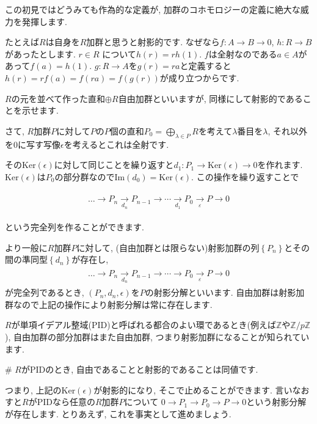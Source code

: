 \documentclass{jsarticle}
\def\Im{\mathrm{Im}}
\def\Ker{\mathrm{Ker}}
\theoremstyle{definition}
\numberwithin{theorem}{section}
\begin{document}
この初見ではどうみても作為的な定義が, 加群のコホモロジーの定義に絶大な威力を発揮します.

たとえば$R$は自身を$R$加群と思うと射影的です. なぜなら$f: A\rightarrow B\rightarrow 0$, $h: R \rightarrow B$があったとします.
$r\in R$ について$h(r) = rh(1)$. $f$は全射なのである$a\in A$があって$f(a) = h(1)$. $g:R \rightarrow A$を$g(r) = ra$と定義すると
$h(r) = rf(a) = f(ra) = f(g(r))$が成り立つからです.

$R$の元を並べて作った直和$\oplus R$自由加群といいますが, 同様にして射影的であることを示せます.

さて, $R$加群$P$に対して$P$の$P$個の直和$\displaystyle P_0 = \bigoplus_{\lambda\in P} R$を考えて$\lambda$番目を$\lambda$, それ以外を0に写す写像$\epsilon$を考えるとこれは全射です.

その$\Ker(\epsilon)$に対して同じことを繰り返すと$d_1: P_1 \rightarrow \Ker(\epsilon) \rightarrow 0$を作れます.
$\Ker(\epsilon)$は$P_0$の部分群なので$\Im(d_0) = \Ker(\epsilon)$. この操作を繰り返すことで


\begin{eqnarray*}
\begin{aligned}
\ldots \rightarrow P_n \xrightarrow[d_n]{} P_{n-1} \rightarrow \cdots \xrightarrow[d_1]{} P_0 \xrightarrow[\varepsilon]{} P \rightarrow 0
\end{aligned}
\end{eqnarray*}

という完全列を作ることができます.

より一般に$R$加群$P$に対して, (自由加群とは限らない)射影加群の列$\left\{P_n\right\}$とその間の準同型$\left\{d_n\right\}$が存在し, 
\begin{eqnarray*}
\begin{aligned}
\ldots \rightarrow P_n \xrightarrow[d_n]{} P_{n-1} \rightarrow \cdots \rightarrow P_0 \xrightarrow[\varepsilon]{} P \rightarrow 0
\end{aligned}
\end{eqnarray*}
が完全列であるとき, $(P_n, d_n, \epsilon)$を$P$の射影分解といいます. 自由加群は射影加群なので上記の操作により射影分解は常に存在します.

$R$が単項イデアル整域(PID)と呼ばれる都合のよい環であるとき(例えば$\mathbb{Z}$や$\mathbb{Z}/p\mathbb{Z}$), 自由加群の部分加群はまた自由加群, つまり射影加群になることが知られています.

\# $R$がPIDのとき, 自由であることと射影的であることは同値です.

つまり, 上記の$\Ker(\epsilon)$が射影的になり, そこで止めることができます. 言いなおすと$R$がPIDなら任意の$R$加群$P$について
$0\rightarrow P_1 \rightarrow P_0 \rightarrow P \rightarrow 0$という射影分解が存在します. とりあえず, これを事実として進めましょう.
\end{document}
